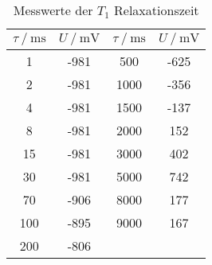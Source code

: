 \begin{table}
\centering
\caption{Messwerte der $T_1$ Relaxationszeit}
\begin{tabular}{S[table-format=3.0]  S[table-format=4.0] | S[table-format=3.0]  S[table-format=4.0]  }
\toprule
{} & 
&  &   \\
   & -981 & 500  & -625 \\
2   & -981 & 1000 & -356 \\
4   & -981 & 1500 & -137 \\
8   & -981 & 2000 & 152  \\
15  & -981 & 3000 & 402  \\
30  & -981 & 5000 & 742  \\
70  & -906 & 8000 & 177  \\
100 & -895 & 9000 & 167  \\
200 & -806 \\
\bottomrule
\end{tabular}
\label{table:01}
\end{table}
